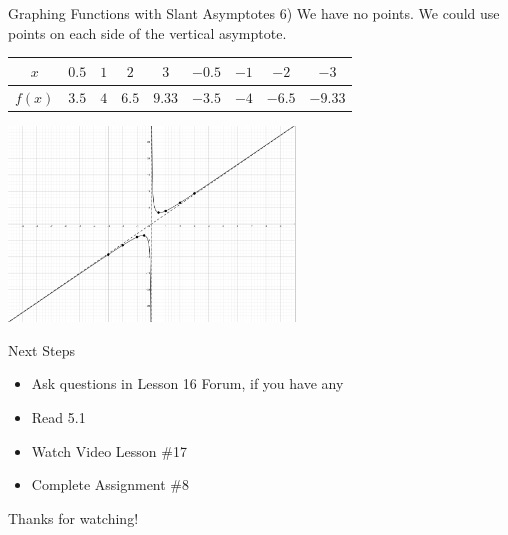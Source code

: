 \documentclass[t, aspectratio=169]{beamer}
\begin{document}
	\begin{frame}{Graphing Functions with Slant Asymptotes}
		6) We have no points. We could use points on each side of the vertical asymptote. \pause
		
		\begin{tabular}{c|cccccccc}
			$x$ & $0.5$ & $1$ & $2$ & $3$ & $-0.5$ & $-1$ & $-2$ & $-3$ \\ \hline
			$f(x)$ & $3.5$ & $4$ & $6.5$ & $9.33$ & $-3.5$ & $-4$ & $-6.5$ & $-9.33$
		\end{tabular} \pause
	
		\includegraphics[width=3in]{Rat4.png}
	\end{frame}

	\begin{frame}{Next Steps}
		\begin{itemize}
			\item Ask questions in Lesson 16 Forum, if you have any
			\item Read 5.1
			\item Watch Video Lesson \#17
			\item Complete Assignment \#8 
		\end{itemize}
	
	\vfill
	
	Thanks for watching!
	\end{frame}
\end{document}
